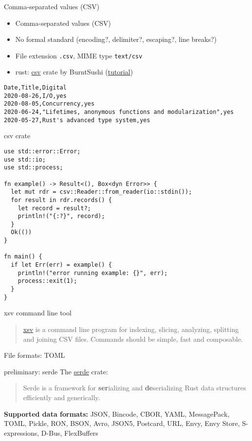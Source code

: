 \documentclass{beamer}
\begin{document}
\begin{frame}[fragile]{Comma-separated values (CSV)}
  \begin{itemize}
    \item Comma-separated values (CSV)
    \item No formal standard (encoding?, delimiter?, escaping?, line breaks?)
    \item File extension \texttt{.csv}, MIME type \texttt{text/csv}
    \item rust: \href{https://github.com/BurntSushi/rust-csv}{csv} crate by BurntSushi (\href{https://docs.rs/csv/1.0.0/csv/tutorial/index.html}{tutorial})
  \end{itemize}

  \begin{verbatim}
Date,Title,Digital
2020-08-26,I/O,yes
2020-08-05,Concurrency,yes
2020-06-24,"Lifetimes, anonymous functions and modularization",yes
2020-05-27,Rust's advanced type system,yes
  \end{verbatim}
\end{frame}

\begin{frame}[fragile]{csv crate}
  \begin{verbatim}
use std::error::Error;
use std::io;
use std::process;

fn example() -> Result<(), Box<dyn Error>> {
  let mut rdr = csv::Reader::from_reader(io::stdin());
  for result in rdr.records() {
    let record = result?;
    println!("{:?}", record);
  }
  Ok(())
}

fn main() {
  if let Err(err) = example() {
    println!("error running example: {}", err);
    process::exit(1);
  }
}
  \end{verbatim}
\end{frame}

\begin{frame}[fragile]{xsv command line tool}
  \begin{quote}
    \href{https://github.com/BurntSushi/xsv}{xsv} is a command line program for indexing, slicing, analyzing, splitting and joining CSV files. Commands should be simple, fast and composable.
  \end{quote}
\end{frame}

\begin{frame}[standout]
  File formats: TOML
\end{frame}

\begin{frame}[fragile]{preliminary: serde}
  The \href{https://serde.rs/}{serde} crate:
  \begin{quote}
    Serde is a framework for \textbf{ser}ializing and \textbf{de}serializing Rust data structures efficiently and generically.
  \end{quote}

  \textbf{Supported data formats:} JSON, Bincode, CBOR, YAML, MessagePack, TOML, Pickle, RON, BSON, Avro, JSON5, Postcard, URL, Envy, Envy Store, S-expressions, D-Bus, FlexBuffers
\end{frame}
\end{document}
